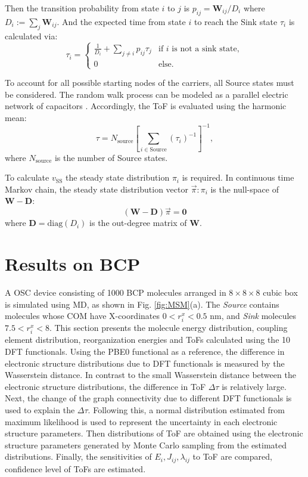\documentclass[letterpaper,12pt]{article}
\begin{document}
Then the transition probability from state $i$ to $j$ is $p_{ij} = \mathbf{W}_{ij}/D_i$ where $D_i := \sum_{j} \mathbf{W}_{ij}$.
And the expected time from state $i$ to reach the Sink state $\tau_i$ is calculated via: 
\begin{equation}\label{eq:hitting_time}
	\tau_i = \begin{cases}
		\frac{1}{D_i} + \sum_{j \ne i} p_{ij} \tau_{j} &\text{if $i$ is not a sink state},\\
		0 &\text{else.} 
	\end{cases}
\end{equation} 

To account for all possible starting nodes of the carriers, all Source states must be considered. The random walk process can be modeled as a parallel electric network of capacitors \cite{doyle_random_2000}. Accordingly, the ToF is evaluated using the harmonic mean:
\begin{equation} 
\tau = N_\text{source} \left[\sum_{i \in \text{Source}} (\tau_i)^{-1}\right]^{-1},
\label{eq:ToF}
\end{equation}
where $N_\text{source}$ is the number of Source states.

To calculate $v_\text{SS}$ the steady state distribution $\pi_i$ is required. In continuous time Markov chain, the steady state distribution vector $\vec{\pi}: \pi_i$ is the null-space of $\mathbf{W}-\mathbf{D}$:
\begin{equation}
    (\mathbf{W}-\mathbf{D} )\vec{\pi} = \mathbf{0}
\end{equation}
where $\mathbf{D} = \text{diag}(D_i)$ is the out-degree matrix of $\mathbf{W}$.
\section{Results on BCP}
\label{sec:result}

A OSC device consisting of 1000 BCP molecules arranged in $8 \times 8 \times 8$ cubic box is simulated using MD, as shown in Fig. \ref{fig:MSM}(a).
The \textit{Source} contains molecules whose COM have X-coordinates $0 < r^x_i < 0.5$ nm, and \textit{Sink} molecules $7.5 < r^x_i < 8$. 
This section presents the molecule energy distribution, coupling element distribution, reorganization energies and ToFs calculated using the 10 DFT functionals. 
Using the PBE0 functional as a reference, the difference in electronic structure distributions due to DFT functionals is measured by the Wasserstein distance. In contrast to the small Wasserstein distance between the electronic structure distributions, the difference in ToF $\Delta \tau$ is relatively large. 
Next, the change of the graph connectivity due to different DFT functionals is used to explain the $\Delta \tau$.
Following this, a normal distribution estimated from maximum likelihood is used to represent the uncertainty in each electronic structure parameters. Then distributions of ToF are obtained using the electronic structure parameters generated by Monte Carlo sampling from the estimated distributions. Finally, the sensitivities of $E_i,J_{ij},\lambda_{ij}$ to ToF are compared, confidence level of ToFs are estimated. 
\end{document}
